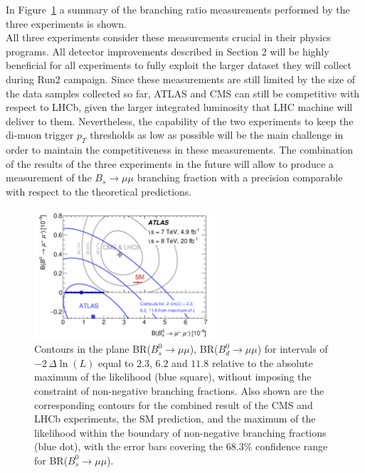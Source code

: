 \documentclass{PoS}
\begin{document}
In Figure~\ref{fig:BsBd} a summary of the branching ratio measurements performed by the three experiments is shown.\\
All three experiments consider these measurements crucial in their physics programs. All detector improvements described in Section 2 will be highly beneficial for all experiments to fully exploit the larger dataset they will collect during Run2 campaign. Since these measurements are still limited by the size of the data samples collected so far, ATLAS and CMS can still be competitive with respect to LHCb, given the larger integrated luminosity that LHC machine will deliver to them. Nevertheless, the capability of the two experiments to keep the di-muon trigger $p_T$ thresholds as low as possible will be the main challenge in order to maintain the competitiveness in these measurements. The combination of the results of the three experiments in the future will allow to produce a measurement of the $B_s \to \mu \mu$  branching fraction with a precision comparable with respect to the theoretical predictions.

\begin{figure}[!t]
  \begin{center}
    \includegraphics[width=0.6\textwidth]{fig_09.png}
    \caption
        {Contours in the plane  BR($B^0_s \to \mu \mu$), BR($B^0_d \to \mu \mu$) for intervals of
          $-2\, \Delta \ln(L)$ equal to $2.3$, $6.2$ and $11.8$ relative to the absolute maximum 
          of the likelihood (blue square), without imposing the constraint of non-negative branching fractions. 
          Also shown are the corresponding contours for the combined result of the CMS and LHCb 
          experiments, the SM prediction, and the maximum of the likelihood within the boundary of non-negative 
          branching fractions (blue dot), with the error bars covering the 68.3\% confidence range for BR($B^0_s \to \mu \mu$).}
        \label{fig:BsBd}
  \end{center}
\end{figure}
\end{document}
